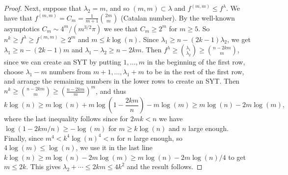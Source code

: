 \documentclass[10pt,a4paper]{amsart}
\newcommand{\la}{\lambda}
\begin{document}
\begin{proof}
Next, suppose that $\la_2 =m$, and so $(m,m) \subset \la$ and $f^{(m,m)}\leq f^\la$. We have that $f^{(m,m)}=C_m = \frac{1}{m+1}\binom{2m}{m}$ (Catalan number). By the well-known asymptotics $C_m \sim 4^m/(m^{3/2} \pi)$ we see that $C_m \geq 2^m$ for $m\geq 5$. So $n^k \geq f^\la \geq f^{(m,m)} \geq 2^m$ and $m\leq k\log(n)$. 
Since $\la_1 \geq n-(2k-1)\la_2$, we get $\la_1 \geq n - (2k-1)m$ and $\la_1-\la_2 \geq n-2km$. Then $f^\la \geq \binom{ \la_1}{\la_2} \geq \binom{ n-2km}{m}$, since we can create an SYT by putting $1,\ldots,m$ in the beginning of the first row, choose $\la_1-m$ numbers from $m+1,\ldots,\la_1+m$ to be in the rest of the first row, and arrange the remaining numbers in the lower rows to create an SYT. 
Then $n^k \geq \binom{n-2km}{m} \geq \left( \frac{n-2km}{m} \right)^m$, and thus
$$k \log(n) \geq m\log(n) +m \log\left(1 - \frac{2km}{n}\right) -m\log(m) \geq m\log(n) - 2m\log(m),$$
where the last inequality follows since for $2mk<n$ we have $\log(1-2km/n) \geq -\log(m)$ for $m \geq k\log(n)$ and $n$ large enough. Finally, since $m^4< k^4 \log(n)^4< n$ for $n$ large enough, so $4\log(m) \leq \log(n)$, we use it in the last line $k\log(n) \geq m\log(n) -2m \log(m)\geq  m\log(n) - 2m \log(n)/4$ to get  $m\leq 2k$.   This gives $\la_2 + \cdots \leq 2k m \leq 4k^2$ and the result follows. 
\end{proof}
\end{document}
